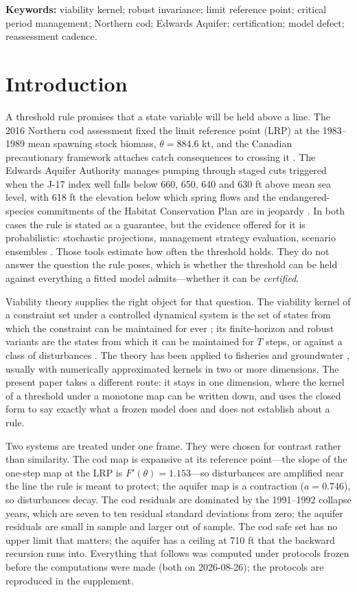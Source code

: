 \documentclass[11pt,a4paper]{article}
\theoremstyle{plain}
\theoremstyle{definition}
\theoremstyle{remark}
\newcommand{\LRP}{\theta}
\begin{document}
\noindent\textbf{Keywords:} viability kernel; robust invariance; limit reference point; critical period management; Northern cod; Edwards Aquifer; certification; model defect; reassessment cadence.

\section{Introduction}\label{sec:intro}

A threshold rule promises that a state variable will be held above a line. The 2016 Northern cod assessment fixed the limit reference point (LRP) at the 1983--1989 mean spawning stock biomass, $\LRP=884.6$ kt, and the Canadian precautionary framework attaches catch consequences to crossing it \cite{DFO2009,DFO2016}. The Edwards Aquifer Authority manages pumping through staged cuts triggered when the J-17 index well falls below 660, 650, 640 and 630 ft above mean sea level, with 618 ft the elevation below which spring flows and the endangered-species commitments of the Habitat Conservation Plan are in jeopardy \cite{EAA2024,EARIP2021,NRC2015}. In both cases the rule is stated as a guarantee, but the evidence offered for it is probabilistic: stochastic projections, management strategy evaluation, scenario ensembles \cite{Butterworth2007,Punt2016}. Those tools estimate how often the threshold holds. They do not answer the question the rule poses, which is whether the threshold can be held against everything a fitted model admits---whether it can be \emph{certified}.

Viability theory supplies the right object for that question. The viability kernel of a constraint set under a controlled dynamical system is the set of states from which the constraint can be maintained for ever \cite{Aubin1991}; its finite-horizon and robust variants are the states from which it can be maintained for $T$ steps, or against a class of disturbances \cite{BertsekasRhodes1971,RegnierDeLara2015}. The theory has been applied to fisheries and groundwater \cite{Bene2001,Martinet2007,Doyen2012,Krawczyk2013,Pereau2018,Pereau2019,Oubraham2018}, usually with numerically approximated kernels in two or more dimensions. The present paper takes a different route: it stays in one dimension, where the kernel of a threshold under a monotone map can be written down, and uses the closed form to say exactly what a frozen model does and does not establish about a rule.

Two systems are treated under one frame. They were chosen for contrast rather than similarity. The cod map is expansive at its reference point---the slope of the one-step map at the LRP is $F'(\LRP)=1.153$---so disturbances are amplified near the line the rule is meant to protect; the aquifer map is a contraction ($a=0.746$), so disturbances decay. The cod residuals are dominated by the 1991--1992 collapse years, which are seven to ten residual standard deviations from zero; the aquifer residuals are small in sample and larger out of sample. The cod safe set has no upper limit that matters; the aquifer has a ceiling at 710 ft that the backward recursion runs into. Everything that follows was computed under protocols frozen before the computations were made (both on 2026-08-26); the protocols are reproduced in the supplement.
\end{document}
